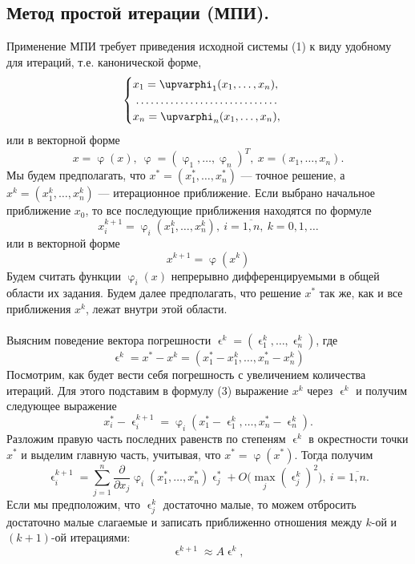 \documentclass[a4paper, 12pt]{report}
\numberwithin{equation}{section}
\renewcommand{\varphi}{\upvarphi}
\renewcommand{\varepsilon}{\upvarepsilon}
\begin{document}
\subsection{Метод простой итерации (МПИ).}
Применение МПИ требует приведения исходной системы (1) к виду удобному для итераций, т.е. канонической форме, 
\begin{equation}
	\begin{cases}
		x_1 = \varphi_1(x_1, \ldots, x_n),\\
		\dotfill\\
		x_n = \varphi_n(x_1,\ldots, x_n),
	\end{cases}
\end{equation}
или в векторной форме $$x = \varphi(x),\ \varphi = (\varphi_1,\ldots, \varphi_n)^T,\ x=(x_1, \ldots, x_n).$$
Мы будем предполагать, что $x^*=(x_1^*,\ldots, x_n^*)$ --- точное решение, а $x^k = (x_1^k,\ldots, x_n^k)$ --- итерационное приближение. Если выбрано начальное приближение $x_0$, то все последующие приближения находятся по формуле $$x_{i}^{k+1} = \varphi_i(x_1^k,\ldots, x_n^k), \ i = \overline{1,n},\ k=0,1,\ldots$$ или в векторной форме \begin{equation}
	x^{k+1} = \varphi(x^k)
\end{equation}
Будем считать функции $\varphi_i(x)$ непрерывно дифференцируемыми в общей области их задания. Будем далее предполагать, что решение $x^*$ так же, как и все приближения $x^k$, лежат внутри этой области.\\\\
Выясним поведение вектора погрешности $\varepsilon^k = (\varepsilon_1^k,\ldots, \varepsilon_n^k)$, где $$\varepsilon^k = x^* - x^k = (x_1^* - x_1^k,\ldots, x_n^* - x_n^k)$$
Посмотрим, как будет вести себя погрешность с увеличением количества итераций. Для этого подставим в формулу (3) выражение $x^k$ через $\varepsilon^k$ и получим следующее выражение $$x_i^* - \varepsilon_i^{k+1} = \varphi_i(x_1^* - \varepsilon_1^k,\ldots, x_n^* - \varepsilon_n^k).$$
Разложим правую часть последних равенств по степеням $\varepsilon^k$ в окрестности точки $x^*$ и выделим главную часть, учитывая, что $x^* = \varphi(x^*)$. Тогда получим $$\varepsilon_i^{k+1} = \sum_{j=1}^{n}\dfrac{\partial}{\partial x_j}\varphi_i(x_1^*,\ldots, x_n^*)\varepsilon_j^* + O\Big(\max_j (\varepsilon_j^k)^2\Big),\ i = \overline{1,n}.$$
Если мы предположим, что $\varepsilon_j^k$ достаточно малые, то можем отбросить достаточно малые слагаемые и записать приближенно отношения между $k$-ой и $(k+1)$-ой итерациями:
\begin{equation}
	\varepsilon^{k+1}\approx A\varepsilon^k,
\end{equation}
\end{document}
